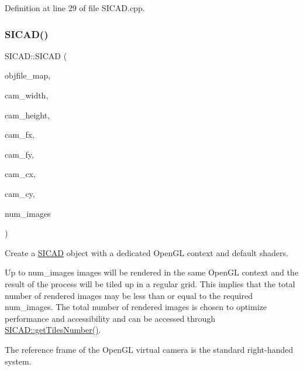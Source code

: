 Definition at line 29 of file S\+I\+C\+A\+D.\+cpp.

\mbox{\label{classSICAD_aa164d674fd047a3522efe18450094ab7}} 
\subsubsection{\texorpdfstring{S\+I\+C\+A\+D()}{SICAD()}\hspace{0.1cm}{\footnotesize\ttfamily [2/4]}}
{\footnotesize\ttfamily S\+I\+C\+A\+D\+::\+S\+I\+C\+AD (\begin{DoxyParamCaption}\item[{const \mbox{\hyperlink{classSICAD_a9e1e1460d4c0f331b4fd015aae4dd721}{Model\+Path\+Container}} \&}]{objfile\+\_\+map,  }\item[{const G\+Lsizei}]{cam\+\_\+width,  }\item[{const G\+Lsizei}]{cam\+\_\+height,  }\item[{const G\+Lfloat}]{cam\+\_\+fx,  }\item[{const G\+Lfloat}]{cam\+\_\+fy,  }\item[{const G\+Lfloat}]{cam\+\_\+cx,  }\item[{const G\+Lfloat}]{cam\+\_\+cy,  }\item[{const G\+Lint}]{num\+\_\+images }\end{DoxyParamCaption})}



Create a \mbox{\hyperlink{classSICAD}{S\+I\+C\+AD}} object with a dedicated Open\+GL context and default shaders. 

Up to {\ttfamily num\+\_\+images} images will be rendered in the same Open\+GL context and the result of the process will be tiled up in a regular grid. This implies that the total number of rendered images may be less than or equal to the required {\ttfamily num\+\_\+images}. The total number of rendered images is chosen to optimize performance and accessibility and can be accessed through {\ttfamily \mbox{\hyperlink{classSICAD_a728f82ebbfeea54f3fef2fc0c56a4964}{S\+I\+C\+A\+D\+::get\+Tiles\+Number()}}}.

The reference frame of the Open\+GL virtual camera is the standard right-\/handed system.



